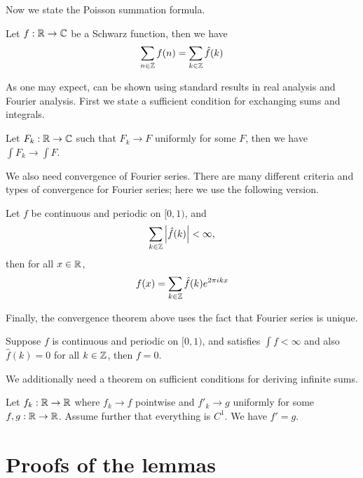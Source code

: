 \documentclass{article}
\begin{document}
Now we state the Poisson summation formula.
\begin{lemma}
	\label{lemma:Poisson-summation}
	Let $f:\mathbb{R}\rightarrow\mathbb{C}$ be a Schwarz function, then we have
	\begin{equation}
		\sum_{n\in\mathbb{Z}}f(n)=\sum_{k\in\mathbb{Z}}\hat{f}(k)
	\end{equation}
\end{lemma}

As one may expect,  can be shown using standard results in real analysis and Fourier analysis.
First we state a sufficient condition for exchanging sums and integrals.
\begin{theorem}
	\label{theorem:exchange-sum-and-integral}
	Let $F_k:\mathbb{R}\rightarrow\mathbb{C}$ such that $F_k\rightarrow F$ uniformly for some $F$, then we have $\int F_k\rightarrow \int F$.
\end{theorem}
We also need convergence of Fourier series.
There are many different criteria and types of convergence for Fourier series;
here we use the following version.
\begin{theorem}
	\label{theorem:Fourier-converge}
	Let $f$ be continuous and periodic on $[0, 1)$, and
	\begin{equation}
		\sum_{k\in\mathbb{Z}}\abs{\hat{f}(k)}<\infty,
	\end{equation}
	then for all $x\in\mathbb{R}$,
	\begin{equation}
		f(x)=\sum_{k\in\mathbb{Z}}\hat{f}(k)e^{2\pi ikx}
	\end{equation}
\end{theorem}
Finally, the convergence theorem above uses the fact that Fourier series is unique.
\begin{theorem}
	\label{theorem:Fourier-unique}
	Suppose $f$ is continuous and periodic on $[0, 1)$, and satisfies $\int f<\infty$ and also $\hat{f}(k)=0$ for all $k\in\mathbb{Z}$, then $f=0$.
\end{theorem}

We additionally need a theorem on sufficient conditions for deriving infinite sums.
\begin{theorem}
	\label{theorem:derive-infinite-sum}
	Let $f_k:\mathbb{R}\rightarrow\mathbb{R}$ where $f_k\rightarrow f$ pointwise and $f'_k\rightarrow g$ uniformly for some $f, g: \mathbb{R}\rightarrow\mathbb{R}$.
	Assume further that everything is $C^1$.
	We have $f'=g$.
\end{theorem}

\section{Proofs of the lemmas}
\end{document}
